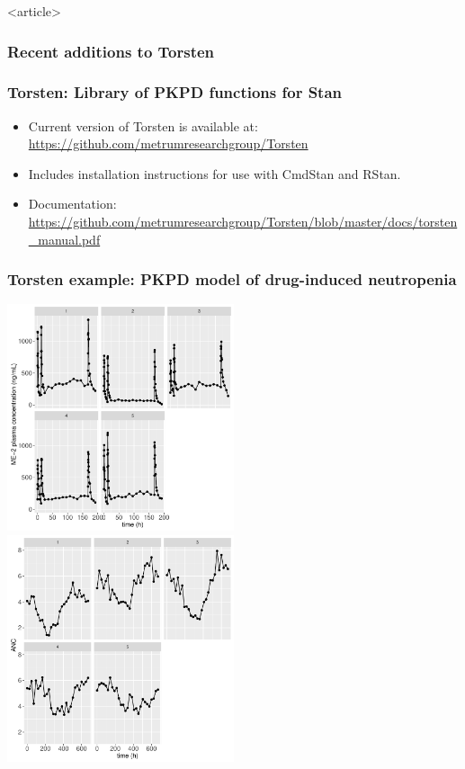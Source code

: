 \documentclass{beamer}
\begin{document}
\begin{frame}<article>
  \frametitle{Recent additions to Torsten}
  

\end{frame}

\begin{frame}
  \frametitle{Torsten: Library of PKPD functions for Stan}

  \begin{itemize}
  \item Current version of Torsten is available at:
    \url{https://github.com/metrumresearchgroup/Torsten}
\item Includes installation instructions for use with CmdStan and RStan.
\item Documentation:
  \url{https://github.com/metrumresearchgroup/Torsten/blob/master/docs/torsten_manual.pdf}
  \end{itemize}
  
\end{frame}

\begin{frame}
  \frametitle{Torsten example: PKPD model of drug-induced neutropenia}
  
\begin{center}
\includegraphics[width=0.5\textwidth]{graphics/neutropenia1TorstenNcpPlots001.pdf}
\includegraphics[width=0.5\textwidth]{graphics/neutropenia1TorstenNcpPlots002.pdf}
\end{center}

\end{frame}
\end{document}
